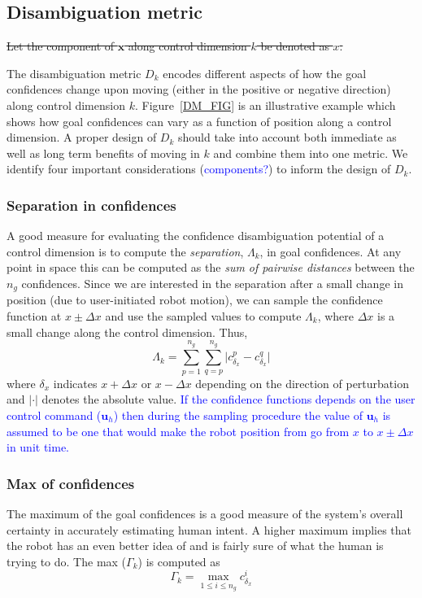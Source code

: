 \documentclass[conference]{IEEEtran}
\begin{document}
\subsection{Disambiguation metric}\label{DM}
\sout{Let the component of $\boldsymbol{x}$ along control dimension $k$ be denoted as $x$. }

The disambiguation metric $D_{k}$ encodes different aspects of how the goal confidences change upon moving (either in the positive or negative direction) along control dimension $k$. Figure~\ref{DM_FIG} is an illustrative example which shows how goal confidences can vary as a function of position along a control dimension. A proper design of $D_{k}$ should take into account both immediate as well as long term benefits of moving in $k$ and combine them into one metric. We identify four important considerations (\textcolor{blue}{components?}) to  inform the design of $D_{k}$.

\subsubsection{Separation in confidences}
A good measure for evaluating the confidence disambiguation potential of a control dimension is to compute the \textit{separation}, $\Lambda_{k}$, in goal confidences. At any point in space this can be computed as the \textit{sum of pairwise distances} between the $n_g$ confidences. Since we are interested in the separation after a small change in position (due to user-initiated robot motion), we can sample the confidence function at $x\pm\Delta x$ and use the sampled values to compute $\Lambda_{k}$, where $\Delta x$ is a small change along the control dimension. Thus,
\begin{equation*}
\Lambda_{k} = \sum_{p=1}^{n_g}\sum_{q=p}^{n_g}\lvert c^{p}_{\delta_x} - c^{q}_{\delta_x}\rvert
\end{equation*}
where $\delta_x$ indicates $x+\Delta x$ or $x-\Delta x$ depending on the direction of perturbation and $\lvert\cdot\rvert$ denotes the absolute value. \textcolor{blue}{If the confidence functions depends on the user control command ($\boldsymbol{u}_h$) then during the sampling procedure the value of $\boldsymbol{u}_h$ is assumed to be one that would make the robot position from go from $x$ to $x\pm\Delta x$ in unit time.}
\subsubsection{Max of confidences}
The maximum of the goal confidences is a good measure of the system's overall certainty in accurately estimating human intent. A higher maximum implies that the robot has an even better idea of and is fairly sure of what the human is trying to do. The max ($\Gamma_{k}$) is computed as
\begin{equation*}
\Gamma_{k} =\max\limits_{1 \leq i \leq n_g}c^{i}_{\delta_x}
\end{equation*}
\end{document}
